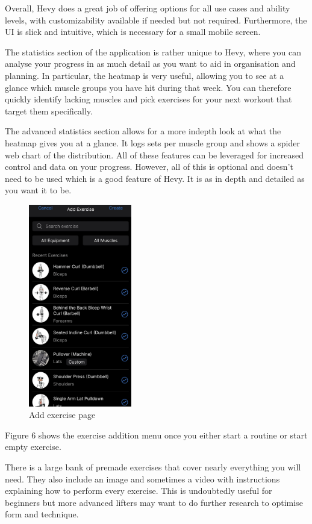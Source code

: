 \documentclass{article}
\begin{document}
Overall, Hevy does a great job of offering options for all use cases and ability levels, with customizability available if needed but not required. Furthermore, the UI is slick and intuitive, which is necessary for a small mobile screen.

The statistics section of the application is rather unique to Hevy, where you can analyse your progress in as much detail as you want to aid in organisation and planning. In particular, the heatmap is very useful, allowing you to see at a glance which muscle groups you have hit during that week. You can therefore quickly identify lacking muscles and pick exercises for your next workout that target them specifically. 

The advanced statistics section allows for a more indepth look at what the heatmap gives you at a glance. It logs sets per muscle group and shows a spider web chart of the distribution. All of these features can be leveraged for increased control and data on your progress. However, all of this is optional and doesn’t need to be used which is a good feature of
Hevy. It is as in depth and detailed as you want it to be.

\begin{figure}
  \centering
  \includegraphics[width=0.4\textwidth]{Figure 6.png}
  \caption{Add exercise page}
\end{figure}

Figure 6 shows the exercise addition menu once you either start a routine or start empty exercise.

There is a large bank of premade exercises that cover nearly everything you will need. They also include an image and sometimes a video with instructions explaining how to perform every exercise. This is undoubtedly useful for beginners but more advanced lifters may want to do further research to optimise form and technique. 
\end{document}
